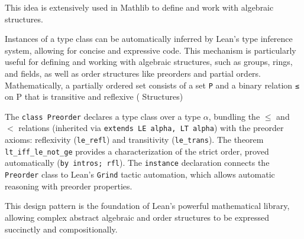 This idea is extensively used in Mathlib to define and work with algebraic structures.

Instances of a type class can be automatically inferred by Lean's type inference system,
allowing for concise and expressive code.
This mechanism is particularly useful for defining and working with algebraic structures,
such as groups, rings, and fields, as well as order structures like preorders and partial orders.
Mathematically, a partially ordered set consists of a set \lstinline[language=lean]|P| 
and a binary relation 
\lstinline[language=lean]|≤| 
on P that is transitive and reflexive (\cite{mathinlean} Structures)



  The \texttt{class Preorder} declares a type class over a type 
 \(\alpha\), bundling the \(\leq\) and \(<\) relations 
 (inherited via \texttt{extends LE alpha, LT alpha}) with the
  preorder axioms: reflexivity (\texttt{le\_refl}) and 
  transitivity (\texttt{le\_trans}).
  The theorem \texttt{lt\_iff\_le\_not\_ge} provides a characterization of the strict order, 
  proved automatically (\texttt{by intros; rfl}).
  The \texttt{instance} declaration connects the \texttt{Preorder} class to Lean’s \texttt{Grind} 
  tactic automation, which allows automatic reasoning with preorder properties.

This design pattern is the foundation of Lean’s powerful mathematical library, 
allowing complex abstract algebraic and order structures to be expressed succinctly and compositionally.

